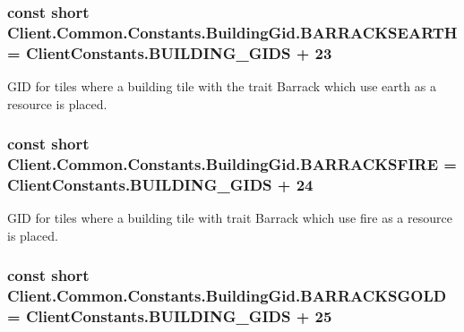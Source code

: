 \subsubsection[{B\+A\+R\+R\+A\+C\+K\+S\+E\+A\+R\+T\+H}]{\setlength{\rightskip}{0pt plus 5cm}const short Client.\+Common.\+Constants.\+Building\+Gid.\+B\+A\+R\+R\+A\+C\+K\+S\+E\+A\+R\+T\+H = {\bf Client\+Constants.\+B\+U\+I\+L\+D\+I\+N\+G\+\_\+\+G\+I\+D\+S} + 23}\label{classClient_1_1Common_1_1Constants_1_1BuildingGid_a0d00300a106b5539506caca786ece775}


G\+I\+D for tiles where a building tile with the trait Barrack which use earth as a resource is placed. 

\hypertarget{classClient_1_1Common_1_1Constants_1_1BuildingGid_a084e44ff1c9033fe6108d7f36495e24b}{}
\subsubsection[{B\+A\+R\+R\+A\+C\+K\+S\+F\+I\+R\+E}]{\setlength{\rightskip}{0pt plus 5cm}const short Client.\+Common.\+Constants.\+Building\+Gid.\+B\+A\+R\+R\+A\+C\+K\+S\+F\+I\+R\+E = {\bf Client\+Constants.\+B\+U\+I\+L\+D\+I\+N\+G\+\_\+\+G\+I\+D\+S} + 24}\label{classClient_1_1Common_1_1Constants_1_1BuildingGid_a084e44ff1c9033fe6108d7f36495e24b}


G\+I\+D for tiles where a building tile with trait Barrack which use fire as a resource is placed. 

\hypertarget{classClient_1_1Common_1_1Constants_1_1BuildingGid_abd33d04a9f704c2f66905081edb46a35}{}
\subsubsection[{B\+A\+R\+R\+A\+C\+K\+S\+G\+O\+L\+D}]{\setlength{\rightskip}{0pt plus 5cm}const short Client.\+Common.\+Constants.\+Building\+Gid.\+B\+A\+R\+R\+A\+C\+K\+S\+G\+O\+L\+D = {\bf Client\+Constants.\+B\+U\+I\+L\+D\+I\+N\+G\+\_\+\+G\+I\+D\+S} + 25}\label{classClient_1_1Common_1_1Constants_1_1BuildingGid_abd33d04a9f704c2f66905081edb46a35}


